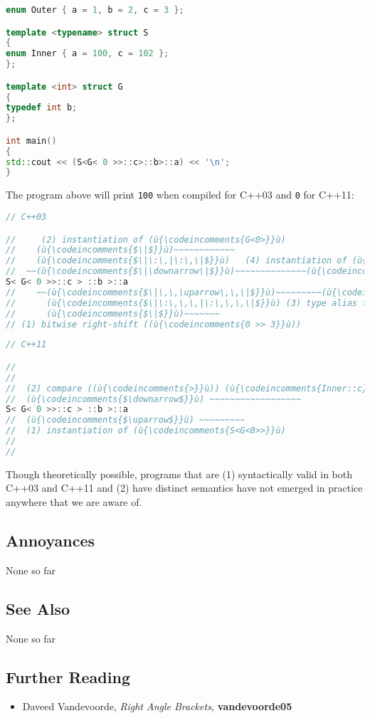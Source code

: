 \begin{lstlisting}[language=C++]
enum Outer { a = 1, b = 2, c = 3 };

template <typename> struct S
{
enum Inner { a = 100, c = 102 };
};

template <int> struct G
{
typedef int b;
};

int main()
{
std::cout << (S<G< 0 >>::c>::b>::a) << '\n';
}
\end{lstlisting}

\noindent The program above will print \texttt{100} when compiled for C++03 and
\texttt{0} for C++11:

\begin{lstlisting}[language=C++]
// C++03

//     (2) instantiation of (ù{\codeincomments{G<0>}}ù)
//    (ù{\codeincomments{$\|$}}ù)~~~~~~~~~~~~
//    (ù{\codeincomments{$\|\:\,|\:\,\|$}}ù)   (4) instantiation of (ù{\codeincomments{S<int>}}ù)
//  ~~(ù{\codeincomments{$\|\downarrow\|$}}ù)~~~~~~~~~~~~~~(ù{\codeincomments{$\downarrow$}}ù)
S< G< 0 >>::c > ::b >::a
//    ~~(ù{\codeincomments{$\|\,\,\uparrow\,\,\|$}}ù)~~~~~~~~~(ù{\codeincomments{$\uparrow$}}ù)
//      (ù{\codeincomments{$\|\:\,\,\,|\:\,\,\,\|$}}ù) (3) type alias for (ù{\codeincomments{int}}ù)
//      (ù{\codeincomments{$\|$}}ù)~~~~~~~
// (1) bitwise right-shift ((ù{\codeincomments{0 >> 3}}ù))
\end{lstlisting}


\begin{lstlisting}[language=C++]
// C++11

//
//
//  (2) compare ((ù{\codeincomments{>}}ù)) (ù{\codeincomments{Inner::c}}ù) and (ù{\codeincomments{Outer::b}}ù)
//  (ù{\codeincomments{$\downarrow$}}ù) ~~~~~~~~~~~~~~~~~~
S< G< 0 >>::c > ::b >::a
//  (ù{\codeincomments{$\uparrow$}}ù) ~~~~~~~~~
//  (1) instantiation of (ù{\codeincomments{S<G<0>>}}ù)
//
//
\end{lstlisting}

\noindent Though theoretically possible, programs that are (1) syntactically valid
in both C++03 and C++11 and (2) have distinct semantics have not
emerged in practice anywhere that we are aware of.

\subsection[Annoyances]{Annoyances}\label{annoyances}

None so far

\subsection[See Also]{See Also}\label{see-also}

None so far

\subsection[Further Reading]{Further Reading}\label{further-reading}

\begin{itemize}
\item{Daveed Vandevoorde, \textit{Right Angle Brackets,} \textbf{vandevoorde05}}
\end{itemize}


